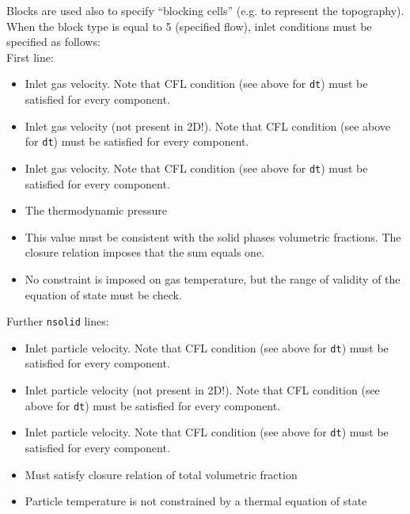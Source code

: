 Blocks are used also to specify ``blocking cells'' (e.g. to 
represent the topography). When the block type is equal to 5 (specified
flow), inlet conditions must be specified as follows:\\

First line:

\begin{itemize}
\item
{}
{Inlet gas velocity. Note that CFL condition (see above for {\tt dt}) 
must be satisfied for every component.}

\item
{}
{Inlet gas velocity (not present in 2D!).
Note that CFL condition (see above for {\tt dt}) 
must be satisfied for every component.}

\item
{}
{Inlet gas velocity. Note that CFL condition (see above for {\tt dt}) 
must be satisfied for every component.}

\item
{}
{The thermodynamic pressure}

\item
{}
{This value must be consistent with the solid phases volumetric fractions.
The closure relation imposes that the sum equals one.}

\item
{}
{No constraint is imposed on gas temperature, but the range of validity
of the equation of state must be check.}
\end{itemize}

Further {\tt nsolid} lines:
\begin{itemize}
\item
{}
{Inlet particle velocity.
Note that CFL condition (see above for {\tt dt}) 
must be satisfied for every component.}

\item
{}
{Inlet particle velocity (not present in 2D!).
Note that CFL condition (see above for {\tt dt}) 
must be satisfied for every component.}

\item
{}
{Inlet particle velocity.
Note that CFL condition (see above for {\tt dt}) 
must be satisfied for every component.}

\item
{}
{Must satisfy closure relation of total volumetric fraction}

\item
{}
{Particle temperature is not constrained by a thermal equation of state}

\end{itemize}

